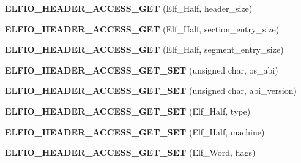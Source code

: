 \begin{DoxyCompactItemize}
\item 
{\bfseries E\+L\+F\+I\+O\+\_\+\+H\+E\+A\+D\+E\+R\+\_\+\+A\+C\+C\+E\+S\+S\+\_\+\+G\+ET} (Elf\+\_\+\+Half, header\+\_\+size)\hypertarget{class_e_l_f_i_o_1_1elfio_a724c168431bfc57f2971dd639e7562f6}{}\label{class_e_l_f_i_o_1_1elfio_a724c168431bfc57f2971dd639e7562f6}

\item 
{\bfseries E\+L\+F\+I\+O\+\_\+\+H\+E\+A\+D\+E\+R\+\_\+\+A\+C\+C\+E\+S\+S\+\_\+\+G\+ET} (Elf\+\_\+\+Half, section\+\_\+entry\+\_\+size)\hypertarget{class_e_l_f_i_o_1_1elfio_a4ef6cb10ed0603f5827dc24e4263bc71}{}\label{class_e_l_f_i_o_1_1elfio_a4ef6cb10ed0603f5827dc24e4263bc71}

\item 
{\bfseries E\+L\+F\+I\+O\+\_\+\+H\+E\+A\+D\+E\+R\+\_\+\+A\+C\+C\+E\+S\+S\+\_\+\+G\+ET} (Elf\+\_\+\+Half, segment\+\_\+entry\+\_\+size)\hypertarget{class_e_l_f_i_o_1_1elfio_aaaaaace05a2318b072cba732fdaf31f1}{}\label{class_e_l_f_i_o_1_1elfio_aaaaaace05a2318b072cba732fdaf31f1}

\item 
{\bfseries E\+L\+F\+I\+O\+\_\+\+H\+E\+A\+D\+E\+R\+\_\+\+A\+C\+C\+E\+S\+S\+\_\+\+G\+E\+T\+\_\+\+S\+ET} (unsigned char, os\+\_\+abi)\hypertarget{class_e_l_f_i_o_1_1elfio_a402231bc0fcfaade53ac1a00d03b1beb}{}\label{class_e_l_f_i_o_1_1elfio_a402231bc0fcfaade53ac1a00d03b1beb}

\item 
{\bfseries E\+L\+F\+I\+O\+\_\+\+H\+E\+A\+D\+E\+R\+\_\+\+A\+C\+C\+E\+S\+S\+\_\+\+G\+E\+T\+\_\+\+S\+ET} (unsigned char, abi\+\_\+version)\hypertarget{class_e_l_f_i_o_1_1elfio_a7a0af3403557d27bab40327fd77694d5}{}\label{class_e_l_f_i_o_1_1elfio_a7a0af3403557d27bab40327fd77694d5}

\item 
{\bfseries E\+L\+F\+I\+O\+\_\+\+H\+E\+A\+D\+E\+R\+\_\+\+A\+C\+C\+E\+S\+S\+\_\+\+G\+E\+T\+\_\+\+S\+ET} (Elf\+\_\+\+Half, type)\hypertarget{class_e_l_f_i_o_1_1elfio_a62ff13bb90d932c129d7a9cee7f3fe0d}{}\label{class_e_l_f_i_o_1_1elfio_a62ff13bb90d932c129d7a9cee7f3fe0d}

\item 
{\bfseries E\+L\+F\+I\+O\+\_\+\+H\+E\+A\+D\+E\+R\+\_\+\+A\+C\+C\+E\+S\+S\+\_\+\+G\+E\+T\+\_\+\+S\+ET} (Elf\+\_\+\+Half, machine)\hypertarget{class_e_l_f_i_o_1_1elfio_a4c490e4dad96669132fb194809b3c1ca}{}\label{class_e_l_f_i_o_1_1elfio_a4c490e4dad96669132fb194809b3c1ca}

\item 
{\bfseries E\+L\+F\+I\+O\+\_\+\+H\+E\+A\+D\+E\+R\+\_\+\+A\+C\+C\+E\+S\+S\+\_\+\+G\+E\+T\+\_\+\+S\+ET} (Elf\+\_\+\+Word, flags)\hypertarget{class_e_l_f_i_o_1_1elfio_ad4886c3772461b05596575735a6fc155}{}\label{class_e_l_f_i_o_1_1elfio_ad4886c3772461b05596575735a6fc155}


\end{DoxyCompactItemize}
